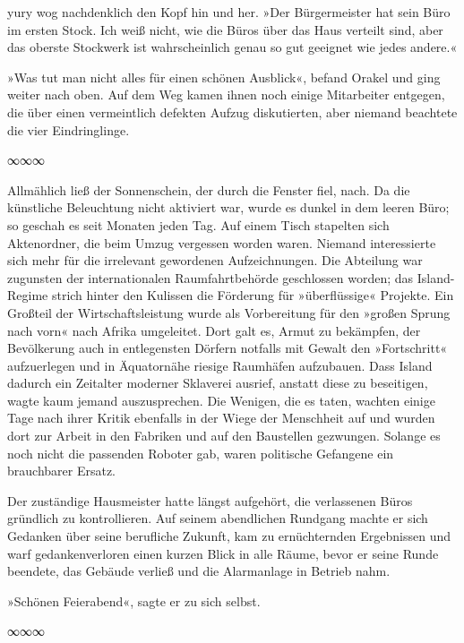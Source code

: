 yury wog nachdenklich den Kopf hin und her. »Der Bürgermeister hat sein Büro im ersten Stock. Ich weiß nicht, wie die Büros über das Haus verteilt sind, aber das oberste Stockwerk ist wahrscheinlich genau so gut geeignet wie jedes andere.«

»Was tut man nicht alles für einen schönen Ausblick«, befand Orakel und ging weiter nach oben. Auf dem Weg kamen ihnen noch einige Mitarbeiter entgegen, die über einen vermeintlich defekten Aufzug diskutierten, aber niemand beachtete die vier Eindringlinge.

\begin{center}
	∞∞∞
\end{center}

Allmählich ließ der Sonnenschein, der durch die Fenster fiel, nach. Da die künstliche Beleuchtung nicht aktiviert war, wurde es dunkel in dem leeren Büro; so geschah es seit Monaten jeden Tag. Auf einem Tisch stapelten sich Aktenordner, die beim Umzug vergessen worden waren. Niemand interessierte sich mehr für die irrelevant gewordenen Aufzeichnungen. Die Abteilung war zugunsten der internationalen Raumfahrtbehörde geschlossen worden; das Island-Regime strich hinter den Kulissen die Förderung für »überflüssige« Projekte. Ein Großteil der Wirtschaftsleistung wurde als Vorbereitung für den »großen Sprung nach vorn« nach Afrika umgeleitet. Dort galt es, Armut zu bekämpfen, der Bevölkerung auch in entlegensten Dörfern notfalls mit Gewalt den »Fortschritt« aufzuerlegen und in Äquatornähe riesige Raumhäfen aufzubauen. Dass Island dadurch ein Zeitalter moderner Sklaverei ausrief, anstatt diese zu beseitigen, wagte kaum jemand auszusprechen. Die Wenigen, die es taten, wachten einige Tage nach ihrer Kritik ebenfalls in der Wiege der Menschheit auf und wurden dort zur Arbeit in den Fabriken und auf den Baustellen gezwungen. Solange es noch nicht die passenden Roboter gab, waren politische Gefangene ein brauchbarer Ersatz.

Der zuständige Hausmeister hatte längst aufgehört, die verlassenen Büros gründlich zu kontrollieren. Auf seinem abendlichen Rundgang machte er sich Gedanken über seine berufliche Zukunft, kam zu ernüchternden Ergebnissen und warf gedankenverloren einen kurzen Blick in alle Räume, bevor er seine Runde beendete, das Gebäude verließ und die Alarmanlage in Betrieb nahm.

»Schönen Feierabend«, sagte er zu sich selbst.

\begin{center}
	∞∞∞
\end{center}

